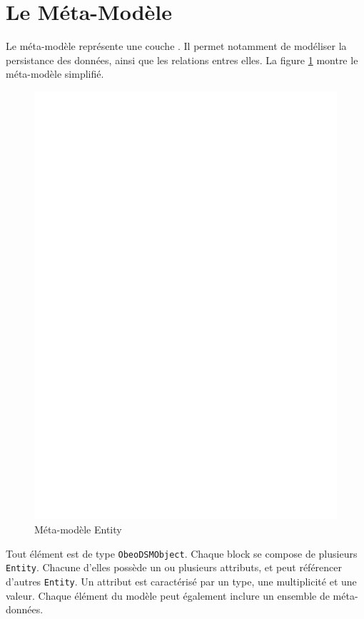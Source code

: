 \section{Le Méta-Modèle \kwentity{}}\label{sub:ent}


Le méta-modèle \kwentity{} représente une couche . Il permet notamment de modéliser la persistance des données, ainsi que les relations entres elles. La figure \ref{fig:ent}  montre le méta-modèle \kwentity{} simplifié.

\begin{figure}[h]
  \centering
  \includegraphics[scale=.4]{img/Entity.eps}
  \caption{Méta-modèle Entity}
  \label{fig:ent}
\end{figure}

Tout élément est de type \verb+ObeoDSMObject+. Chaque block se compose de plusieurs \verb+Entity+. Chacune d'elles possède un ou plusieurs attributs, et peut référencer d'autres \verb+Entity+. Un attribut est caractérisé par un type, une multiplicité et une valeur. Chaque élément du modèle peut également inclure un ensemble de méta-données.

